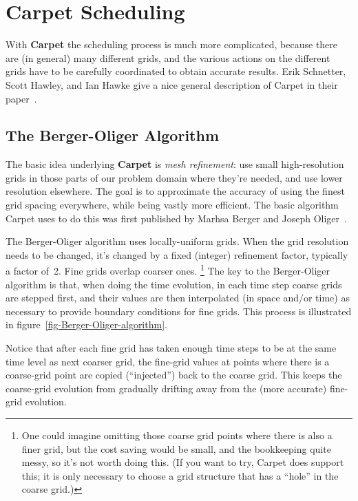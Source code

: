 \documentclass{article}
\def\thorn#1{\textbf{#1}}
\begin{document}

\section{\thorn{Carpet} Scheduling}

With \thorn{Carpet} the scheduling process is much more complicated,
because there are (in general) many different grids, and the various
actions on the different grids have to be carefully coordinated to
obtain accurate results.  Erik Schnetter, Scott Hawley, and Ian Hawke
give a nice general description of Carpet in their
paper~\cite{Schnetter-etal-03b}.


\subsection{The Berger-Oliger Algorithm}
\label{sect-Berger-Oliger-algorithm}

The basic idea underlying \thorn{Carpet} is \emph{mesh refinement}:
use small high-resolution grids in those parts of our problem domain
where they're needed, and use lower resolution elsewhere.  The goal
is to approximate the accuracy of using the finest grid spacing
everywhere, while being vastly more efficient.  The basic algorithm
Carpet uses to do this was first published by Marhsa Berger and
Joseph Oliger~\cite{Berger-1982,Berger84,Berger86,Berger89,Berger91}.

The Berger-Oliger algorithm uses locally-uniform grids.  When the grid
resolution needs to be changed, it's changed by a fixed (integer)
refinement factor, typically a factor of~2.  Fine grids overlap
coarser ones.%
\footnote{%
	 One could imagine omitting those coarse grid
	 points where there is also a finer grid, but the
	 cost saving would be small, and the bookkeeping
	 quite messy, so it's not worth doing this.
	 (If you want to try, Carpet does support this;
	 it is only necessary to choose a grid structure
	 that has a ``hole'' in the coarse grid.)
	 }%
{}  The key to the Berger-Oliger algorithm is that, when doing the time
evolution, in each time step coarse grids are stepped first, and their
values are then interpolated (in space and/or time) as necessary to
provide boundary conditions for fine grids.  This process is illustrated
in figure~\ref{fig-Berger-Oliger-algorithm}.

Notice that after each fine grid has taken enough time steps to be
at the same time level as next coarser grid, the fine-grid values at
points where there is a coarse-grid point are copied (``injected'')
back to the coarse grid.  This keeps the coarse-grid evolution from
gradually drifting away from the (more accurate) fine-grid evolution.
\end{document}
